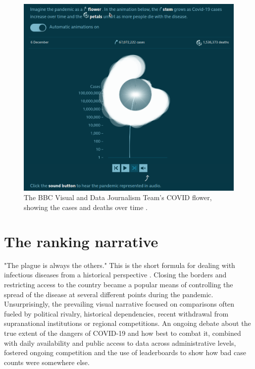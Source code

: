 \documentclass[article]{jdssv}\usepackage[]{graphicx}\usepackage[]{color}
\begin{document}
\begin{figure}
\centering
\includegraphics[width=.8\linewidth]{Figures_Web/BBC_flower_time_series}
\caption{The BBC Visual and Data Journalism Team's COVID flower, showing the cases and deaths over time \citep{thebbcvisualanddatajournalismteamCoronavirusHowCan2020}.}\label{fig:bbc-flower}
\end{figure}


\section{The ranking narrative}
\label{sec:rankings}

"The plague is always the others." This is the short formula for dealing with infectious diseases from a historical perspective \citep{thiessen2021}. Closing the borders and restricting access to the country became a popular means of controlling the spread of the disease at several different points during the pandemic. Unsurprisingly, the prevailing visual narrative focused on comparisons often fueled by political rivalry, historical dependencies, recent withdrawal from supranational institutions or regional competitions. An ongoing debate about the true extent of the dangers of COVID-19 and how best to combat it, combined with daily availability and public access to data across administrative levels, fostered ongoing competition and the use of leaderboards to show how bad case counts were somewhere else. 
\end{document}
